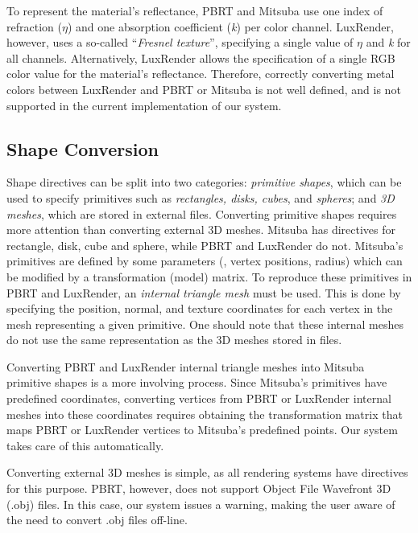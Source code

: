 To represent the material's reflectance, PBRT and Mitsuba use one index of refraction ($\eta$) and one absorption 
coefficient (\textit{k}) per color channel. 
LuxRender, however, uses a so-called ``{\it Fresnel texture}'', specifying a 
single value of $\eta$ and \textit{k} for all channels. Alternatively, LuxRender allows the specification of a single RGB 
color value for the material's reflectance. Therefore, correctly converting metal colors between LuxRender and PBRT or Mitsuba is not well defined, 
and is not supported in the current implementation of our system.

\subsection{Shape Conversion}
Shape directives can be split into two categories: {\it primitive shapes}, which can
be used to specify primitives such as {\it rectangles, disks, cubes}, and {\it spheres};
and {\it 3D meshes}, which are stored in external files. 
%
Converting primitive shapes requires more attention than converting external 3D meshes. 
Mitsuba has directives for rectangle, disk, cube and sphere, while PBRT and LuxRender do not. 
Mitsuba's primitives are defined by some parameters (\eg, vertex positions, radius) which can be modified by 
a transformation (model) matrix. To reproduce these primitives in PBRT and 
LuxRender, an {\it internal triangle mesh} must be used. This is done by specifying the position, normal, and texture coordinates for each vertex in the mesh representing a given primitive. One should note that these internal meshes do not use the same representation as the 3D meshes stored in files.

Converting PBRT and LuxRender internal triangle meshes into Mitsuba primitive shapes is a more involving process. Since Mitsuba's 
primitives have predefined coordinates, converting vertices from PBRT or LuxRender internal meshes into 
these coordinates requires obtaining the transformation matrix that maps PBRT or LuxRender vertices 
to Mitsuba's predefined points. Our system takes care of this automatically.

Converting external 3D meshes is simple, as all rendering systems have directives
for this purpose. PBRT, however, does not support Object File Wavefront 3D
(.obj) files. 
In this case, our system issues a warning, making the user aware of the need to convert .obj files off-line.

